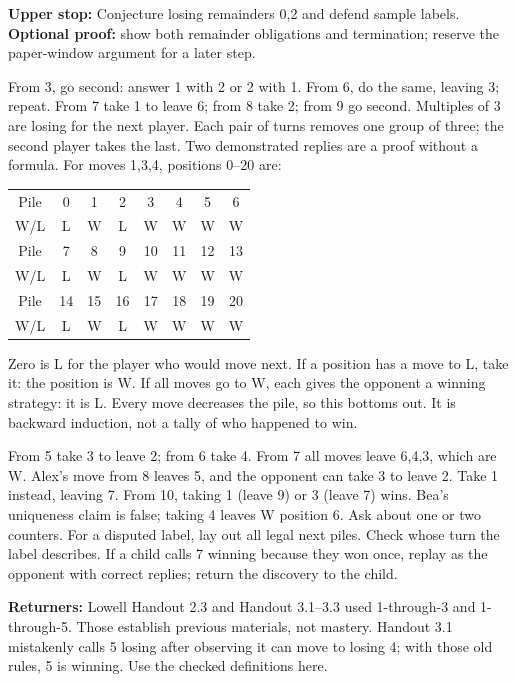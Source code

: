 \documentclass[11pt]{article}
\begin{document}
\textbf{Upper stop:} Conjecture losing remainders 0,2 and defend sample labels. \textbf{Optional proof:} show both remainder obligations and termination; reserve the paper-window argument for a later step.

\newpage
{}
From 3, go second: answer 1 with 2 or 2 with 1. From 6, do the same, leaving 3; repeat. From 7 take 1 to leave 6; from 8 take 2; from 9 go second. Multiples of 3 are losing for the next player. Each pair of turns removes one group of three; the second player takes the last. Two demonstrated replies are a proof without a formula.
For moves 1,3,4, positions 0--20 are:
\begin{center}\renewcommand{\arraystretch}{1.4}\begin{tabular}{c|ccccccc}Pile&0&1&2&3&4&5&6\\W/L&L&W&L&W&W&W&W\\\hline Pile&7&8&9&10&11&12&13\\W/L&L&W&L&W&W&W&W\\\hline Pile&14&15&16&17&18&19&20\\W/L&L&W&L&W&W&W&W\end{tabular}\end{center}
Zero is L for the player who would move next. If a position has a move to L, take it: the position is W. If all moves go to W, each gives the opponent a winning strategy: it is L. Every move decreases the pile, so this bottoms out. It is backward induction, not a tally of who happened to win.

From 5 take 3 to leave 2; from 6 take 4. From 7 all moves leave 6,4,3, which are W. Alex's move from 8 leaves 5, and the opponent can take 3 to leave 2. Take 1 instead, leaving 7. From 10, taking 1 (leave 9) or 3 (leave 7) wins. Bea's uniqueness claim is false; taking 4 leaves W position 6.
Ask about one or two counters. For a disputed label, lay out all legal next piles. Check whose turn the label describes. If a child calls 7 winning because they won once, replay as the opponent with correct replies; return the discovery to the child.

\textbf{Returners:} Lowell Handout 2.3 and Handout 3.1--3.3 used 1-through-3 and 1-through-5. Those establish previous materials, not mastery. Handout 3.1 mistakenly calls 5 losing after observing it can move to losing 4; with those old rules, 5 is winning. Use the checked definitions here.
\end{document}
